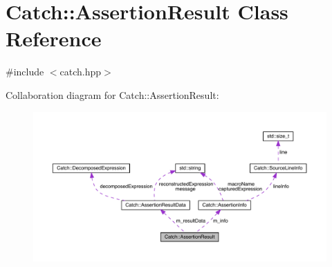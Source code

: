 \hypertarget{class_catch_1_1_assertion_result}{}\section{Catch\+:\+:Assertion\+Result Class Reference}
\label{class_catch_1_1_assertion_result}


{\ttfamily \#include $<$catch.\+hpp$>$}



Collaboration diagram for Catch\+:\+:Assertion\+Result\+:
\nopagebreak
\begin{figure}[H]
\begin{center}
\leavevmode
\includegraphics[width=350pt]{class_catch_1_1_assertion_result__coll__graph}
\end{center}
\end{figure}
